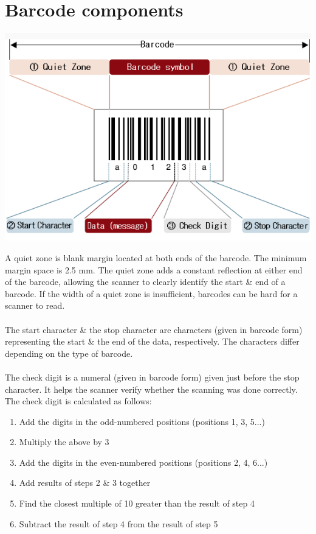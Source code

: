 \section{Barcode components}

\includegraphics{barcodeComponents} \cite{barcode_componentsDiagram}

A quiet zone is blank margin located at both ends of the barcode. The minimum margin space is 2.5 mm. The quiet zone adds a constant reflection at either end of the barcode, allowing the scanner to clearly identify the start \& end of a barcode. If the width of a quiet zone is insufficient, barcodes can be hard for a scanner to read. 
\\~\\
The start character \& the stop character are characters (given in barcode form) representing the start \& the end of the data, respectively. The characters differ depending on the type of barcode.
\\~\\
The check digit is a numeral (given in barcode form) given just before the stop character. It helps the scanner verify whether the scanning was done correctly. The check digit is calculated as follows:

\begin{enumerate}
	\item Add the digits in the odd-numbered positions (positions 1, 3, 5...)
	\item Multiply the above by 3
	\item Add the digits in the even-numbered positions (positions 2, 4, 6...)
	\item Add results of steps 2 \& 3 together
	\item Find the closest multiple of 10 greater than the result of step 4
	\item Subtract the result of step 4 from the result of step 5
\end{enumerate}

